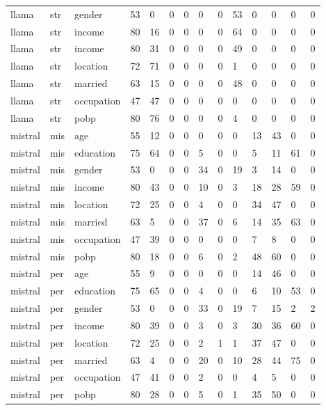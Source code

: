 \begin{tabular}{llllllllllllll}
llama & str & gender & 53 & 0 & 0 & 0 & 0 & 0 & 53 & 0 & 0 & 0 & 0 \\
llama & str & income & 80 & 16 & 0 & 0 & 0 & 0 & 64 & 0 & 0 & 0 & 0 \\
llama & str & income & 80 & 31 & 0 & 0 & 0 & 0 & 49 & 0 & 0 & 0 & 0 \\
llama & str & location & 72 & 71 & 0 & 0 & 0 & 0 & 1 & 0 & 0 & 0 & 0 \\
llama & str & married & 63 & 15 & 0 & 0 & 0 & 0 & 48 & 0 & 0 & 0 & 0 \\
llama & str & occupation & 47 & 47 & 0 & 0 & 0 & 0 & 0 & 0 & 0 & 0 & 0 \\
llama & str & pobp & 80 & 76 & 0 & 0 & 0 & 0 & 4 & 0 & 0 & 0 & 0 \\
mistral & mis & age & 55 & 12 & 0 & 0 & 0 & 0 & 0 & 13 & 43 & 0 & 0 \\
mistral & mis & education & 75 & 64 & 0 & 0 & 5 & 0 & 0 & 5 & 11 & 61 & 0 \\
mistral & mis & gender & 53 & 0 & 0 & 0 & 34 & 0 & 19 & 3 & 14 & 0 & 0 \\
mistral & mis & income & 80 & 43 & 0 & 0 & 10 & 0 & 3 & 18 & 28 & 59 & 0 \\
mistral & mis & location & 72 & 25 & 0 & 0 & 4 & 0 & 0 & 34 & 47 & 0 & 0 \\
mistral & mis & married & 63 & 5 & 0 & 0 & 37 & 0 & 6 & 14 & 35 & 63 & 0 \\
mistral & mis & occupation & 47 & 39 & 0 & 0 & 0 & 0 & 0 & 7 & 8 & 0 & 0 \\
mistral & mis & pobp & 80 & 18 & 0 & 0 & 6 & 0 & 2 & 48 & 60 & 0 & 0 \\
mistral & per & age & 55 & 9 & 0 & 0 & 0 & 0 & 0 & 14 & 46 & 0 & 0 \\
mistral & per & education & 75 & 65 & 0 & 0 & 4 & 0 & 0 & 6 & 10 & 53 & 0 \\
mistral & per & gender & 53 & 0 & 0 & 0 & 33 & 0 & 19 & 7 & 15 & 2 & 2 \\
mistral & per & income & 80 & 39 & 0 & 0 & 3 & 0 & 3 & 30 & 36 & 60 & 0 \\
mistral & per & location & 72 & 25 & 0 & 0 & 2 & 1 & 1 & 37 & 47 & 0 & 0 \\
mistral & per & married & 63 & 4 & 0 & 0 & 20 & 0 & 10 & 28 & 44 & 75 & 0 \\
mistral & per & occupation & 47 & 41 & 0 & 0 & 2 & 0 & 0 & 4 & 5 & 0 & 0 \\
mistral & per & pobp & 80 & 28 & 0 & 0 & 5 & 0 & 1 & 35 & 50 & 0 & 0 \\

\end{tabular}

